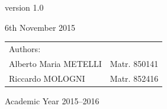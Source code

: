 \begin{titlepage}
\begin{center}
version 1.0
\par\end{center}

\begin{center}
6th November 2015
\par\end{center}

\begin{flushleft}
\vspace{0.5cm}

\par\end{flushleft}

\begin{flushright}
\begin{tabular}{ll}
Authors: & \tabularnewline
Alberto Maria METELLI & Matr. 850141\tabularnewline
Riccardo MOLOGNI & Matr. 852416\tabularnewline
\end{tabular}
\par\end{flushright}

\begin{flushleft}
\vspace{1.8cm}

\par\end{flushleft}

\begin{center}
{\large{}Academic Year 2015–2016}
\par\end{center}{\large \par}

\end{titlepage}
